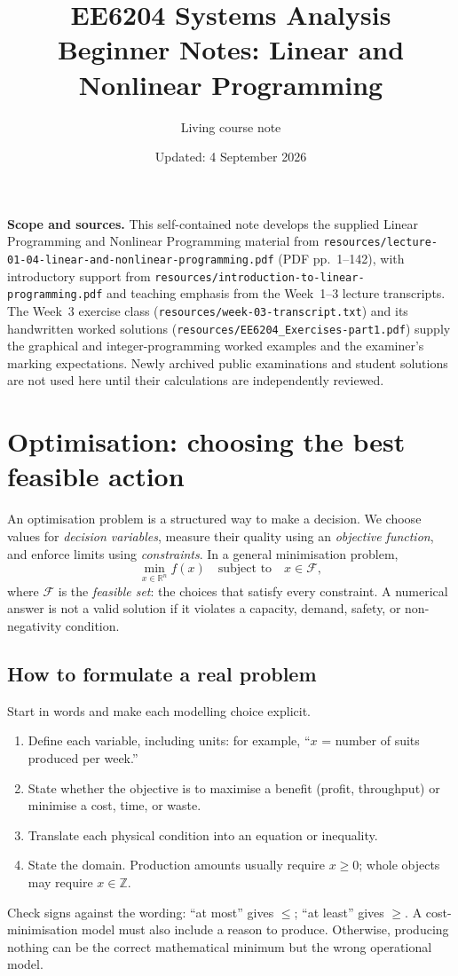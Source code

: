 \documentclass[11pt,a4paper]{article}
\title{EE6204 Systems Analysis\\\large Beginner Notes: Linear and Nonlinear Programming}
\author{Living course note}
\date{Updated: 4 September 2026}
\renewcommand{\texttt}[1]{\nolinkurl{#1}}
\newcommand{\R}{\mathbb{R}}
\begin{document}
\maketitle
\noindent\textbf{Scope and sources.} This self-contained note develops the supplied Linear Programming and Nonlinear Programming material from \texttt{resources/lecture-01-04-linear-and-nonlinear-programming.pdf} (PDF pp.~1--142), with introductory support from \texttt{resources/introduction-to-linear-programming.pdf} and teaching emphasis from the Week~1--3 lecture transcripts. The Week~3 exercise class (\texttt{resources/week-03-transcript.txt}) and its handwritten worked solutions (\texttt{resources/EE6204\_Exercises-part1.pdf}) supply the graphical and integer-programming worked examples and the examiner's marking expectations. Newly archived public examinations and student solutions are not used here until their calculations are independently reviewed.
\tableofcontents

\section{Optimisation: choosing the best feasible action}
An optimisation problem is a structured way to make a decision. We choose values for \emph{decision variables}, measure their quality using an \emph{objective function}, and enforce limits using \emph{constraints}. In a general minimisation problem,
\[
 \min_{x\in\R^n} f(x)\quad\text{subject to}\quad x\in\mathcal F,
\]
where $\mathcal F$ is the \emph{feasible set}: the choices that satisfy every constraint. A numerical answer is not a valid solution if it violates a capacity, demand, safety, or non-negativity condition.

\subsection{How to formulate a real problem}
Start in words and make each modelling choice explicit.
\begin{enumerate}
\item Define each variable, including units: for example, ``$x$ = number of suits produced per week.''
\item State whether the objective is to maximise a benefit (profit, throughput) or minimise a cost, time, or waste.
\item Translate each physical condition into an equation or inequality.
\item State the domain. Production amounts usually require $x\geq0$; whole objects may require $x\in\mathbb Z$.
\end{enumerate}
Check signs against the wording: ``at most'' gives $\leq$; ``at least'' gives $\geq$. A cost-minimisation model must also include a reason to produce. Otherwise, producing nothing can be the correct mathematical minimum but the wrong operational model.
\end{document}
